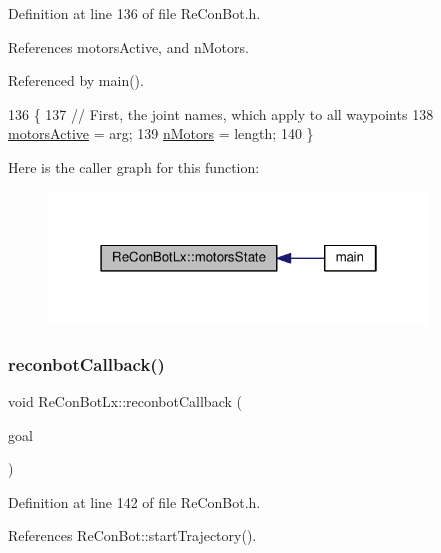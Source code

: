Definition at line 136 of file Re\+Con\+Bot.\+h.



References motors\+Active, and n\+Motors.



Referenced by main().


\begin{DoxyCode}
136                                                   \{
137   \textcolor{comment}{// First, the joint names, which apply to all waypoints}
138   \hyperlink{_re_con_bot_8h_a754c7486afa85fff30b8e7c0ce40c264}{motorsActive} = arg;
139   \hyperlink{_re_con_bot_8h_af9fc8046227b67fb8c85827f5ebc4838}{nMotors} = length;
140 \}
\end{DoxyCode}
Here is the caller graph for this function\+:
\nopagebreak
\begin{figure}[H]
\begin{center}
\leavevmode
\includegraphics[width=286pt]{d2/d07/class_re_con_bot_lx_a0e25f573057755c6729ea572362652e6_icgraph}
\end{center}
\end{figure}
\mbox{\label{class_re_con_bot_lx_a5d60b16962e5ce8e452f7c53543c54ce}} 
\subsubsection{\texorpdfstring{reconbot\+Callback()}{reconbotCallback()}}
{\footnotesize\ttfamily void Re\+Con\+Bot\+Lx\+::reconbot\+Callback (\begin{DoxyParamCaption}\item[{const control\+\_\+msgs\+::\+Follow\+Joint\+Trajectory\+Goal}]{goal }\end{DoxyParamCaption})}



Definition at line 142 of file Re\+Con\+Bot.\+h.



References Re\+Con\+Bot\+::start\+Trajectory().




